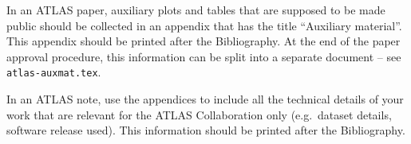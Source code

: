 \documentclass[UKenglish]{latex/atlasdoc}
\begin{document}
In an ATLAS paper, auxiliary plots and tables that are supposed to be made public 
should be collected in an appendix that has the title \enquote{Auxiliary material}.
This appendix should be printed after the Bibliography.
At the end of the paper approval procedure, this information can be split into a separate document
-- see \texttt{atlas-auxmat.tex}.

In an ATLAS note, use the appendices to include all the technical details of your work
that are relevant for the ATLAS Collaboration only (e.g.\ dataset details, software release used).
This information should be printed after the Bibliography.
\end{document}
